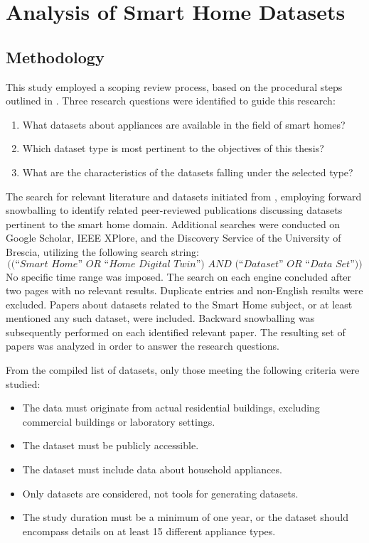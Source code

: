 \chapter{Analysis of Smart Home Datasets}\label{ch:analysis_of_smart_home_datasets}

\section{Methodology}\label{sec:methodology}

This study employed a scoping review process, based on the procedural steps outlined in \parencite{mak_steps_2022}. Three research questions were identified to guide this research:
\begin{enumerate}[label={RQ\arabic*.}, leftmargin=3.5em]
    \item What datasets about appliances are available in the field of smart homes?
    \item Which dataset type is most pertinent to the objectives of this thesis?
    \item What are the characteristics of the datasets falling under the selected type?
\end{enumerate}

The search for relevant literature and datasets initiated from \parencite{barker_smart_2012}, employing forward snowballing to identify related peer-reviewed publications discussing datasets pertinent to the smart home domain. Additional searches were conducted on Google Scholar, IEEE XPlore, and the Discovery Service of the University of Brescia, utilizing the following search string:
\[ \textit{((``Smart Home'' OR ``Home Digital Twin'') AND (``Dataset'' OR ``Data Set''))} \]
No specific time range was imposed. The search on each engine concluded after two pages with no relevant results. Duplicate entries and non-English results were excluded. Papers about datasets related to the Smart Home subject, or at least mentioned any such dataset, were included. Backward snowballing was subsequently performed on each identified relevant paper. The resulting set of papers was analyzed in order to answer the research questions.

From the compiled list of datasets, only those meeting the following criteria were studied:
\begin{itemize}
    \item The data must originate from actual residential buildings, excluding commercial buildings or laboratory settings.
    \item The dataset must be publicly accessible.
    \item The dataset must include data about household appliances.
    \item Only datasets are considered, not tools for generating datasets.
    \item The study duration must be a minimum of one year, or the dataset should encompass details on at least 15 different appliance types.
\end{itemize}


